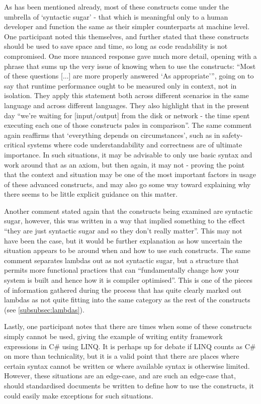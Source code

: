 \documentclass{article}
\begin{document}
            As has been mentioned already, most of these constructs come under the umbrella of `syntactic sugar' - that which is meaningful only to a human developer and function the same as their simpler counterparts at machine level. One participant noted this themselves, and further stated that these constructs should be used to save space and time, so long as code readability is not compromised. One more nuanced response gave much more detail, opening with a phrase that sums up the very issue of knowing when to use the constructs: ``Most of these questions [...] are more properly answered `As appropriate''', going on to say that runtime performance ought to be measured only in context, not in isolation. They apply this statement both across different scenarios in the same language and across different languages. They also highlight that in the present day ``we're waiting for [input/output] from the disk or network - the time spent executing each one of those constructs pales in comparison''. The same comment again reaffirms that `everything depends on circumstances', such as in safety-critical systems where code understandability and correctness are of ultimate importance. In such situations, it may be advisable to only use basic syntax and work around that as an axiom, but then again, it may not - proving the point that the context and situation may be one of the most important factors in usage of these advanced constructs, and may also go some way toward explaining why there seems to be little explicit guidance on this matter.

            Another comment stated again that the constructs being examined are syntactic sugar, however, this was written in a way that implied something to the effect ``they are just syntactic sugar and so they don't really matter''. This may not have been the case, but it would be further explanation as how uncertain the situation appears to be around when and how to use such constructs. The same comment separates lambdas out as not syntactic sugar, but a structure that permits more functional practices that can ``fundamentally change how your system is built and hence how it is compiler optimised''. This is one of the pieces of information gathered during the process that has quite clearly marked out lambdas as not quite fitting into the same category as the rest of the constructs (see \ref{subsubsec:lambdas}).

            Lastly, one participant notes that there are times when some of these constructs simply cannot be used, giving the example of writing entity framework expressions in C\# using LINQ. It is perhaps up for debate if LINQ counts as C\# on more than technicality, but it is a valid point that there are places where certain syntax cannot be written or where available syntax is otherwise limited. However, these situations are an edge-case, and are such an edge-case that, should standardised documents be written to define how to use the constructs, it could easily make exceptions for such situations.
\end{document}
